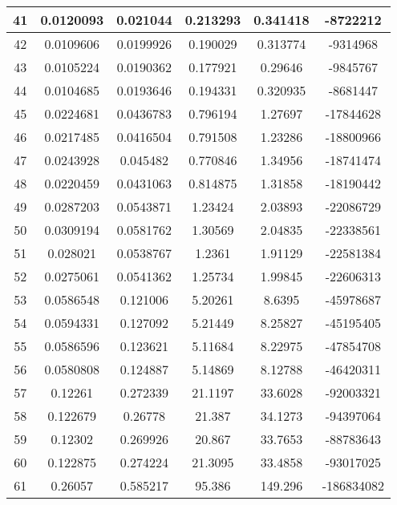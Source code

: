 \begin{longtable}{|c|c|c|c|c|c|}
41    & 0.0120093 & 0.021044          & 0.213293   & 0.341418   & -8722212   \\ \hline
42    & 0.0109606 & 0.0199926         & 0.190029   & 0.313774   & -9314968   \\ \hline
43    & 0.0105224 & 0.0190362         & 0.177921   & 0.29646    & -9845767   \\ \hline
44    & 0.0104685 & 0.0193646         & 0.194331   & 0.320935   & -8681447   \\ \hline
45    & 0.0224681 & 0.0436783         & 0.796194   & 1.27697    & -17844628  \\ \hline
46    & 0.0217485 & 0.0416504         & 0.791508   & 1.23286    & -18800966  \\ \hline
47    & 0.0243928 & 0.045482          & 0.770846   & 1.34956    & -18741474  \\ \hline
48    & 0.0220459 & 0.0431063         & 0.814875   & 1.31858    & -18190442  \\ \hline
49    & 0.0287203 & 0.0543871         & 1.23424    & 2.03893    & -22086729  \\ \hline
50    & 0.0309194 & 0.0581762         & 1.30569    & 2.04835    & -22338561  \\ \hline
51    & 0.028021  & 0.0538767         & 1.2361     & 1.91129    & -22581384  \\ \hline
52    & 0.0275061 & 0.0541362         & 1.25734    & 1.99845    & -22606313  \\ \hline
53    & 0.0586548 & 0.121006          & 5.20261    & 8.6395     & -45978687  \\ \hline
54    & 0.0594331 & 0.127092          & 5.21449    & 8.25827    & -45195405  \\ \hline
55    & 0.0586596 & 0.123621          & 5.11684    & 8.22975    & -47854708  \\ \hline
56    & 0.0580808 & 0.124887          & 5.14869    & 8.12788    & -46420311  \\ \hline
57    & 0.12261   & 0.272339          & 21.1197    & 33.6028    & -92003321  \\ \hline
58    & 0.122679  & 0.26778           & 21.387     & 34.1273    & -94397064  \\ \hline
59    & 0.12302   & 0.269926          & 20.867     & 33.7653    & -88783643  \\ \hline
60    & 0.122875  & 0.274224          & 21.3095    & 33.4858    & -93017025  \\ \hline
61    & 0.26057   & 0.585217          & 95.386     & 149.296    & -186834082 \\ \hline

\end{longtable}
